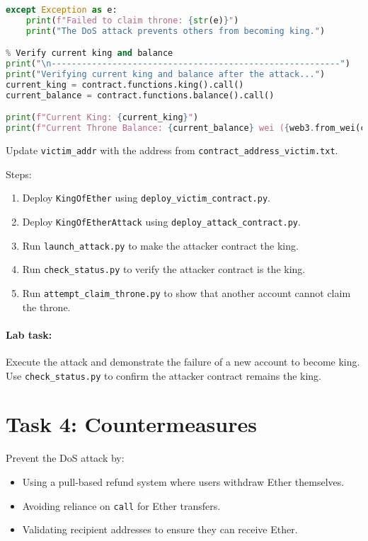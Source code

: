 \begin{lstlisting}[language=python, caption={Attempting to claim throne (\texttt{attempt\_claim\_throne.py})}]
except Exception as e:
    print(f"Failed to claim throne: {str(e)}")
    print("The DoS attack prevents others from becoming king.")

% Verify current king and balance
print("\n---------------------------------------------------------")
print("Verifying current king and balance after the attack...")
current_king = contract.functions.king().call()
current_balance = contract.functions.balance().call()

print(f"Current King: {current_king}")
print(f"Current Throne Balance: {current_balance} wei ({web3.from_wei(current_balance, 'ether')} ETH)")
\end{lstlisting}

Update \texttt{victim\_addr} with the address from \texttt{contract\_address\_victim.txt}.

Steps:
\begin{enumerate}
    \item Deploy \texttt{KingOfEther} using \texttt{deploy\_victim\_contract.py}.
    \item Deploy \texttt{KingOfEtherAttack} using \texttt{deploy\_attack\_contract.py}.
    \item Run \texttt{launch\_attack.py} to make the attacker contract the king.
    \item Run \texttt{check\_status.py} to verify the attacker contract is the king.
    \item Run \texttt{attempt\_claim\_throne.py} to show that another account cannot claim the throne.
\end{enumerate}

\paragraph{Lab task:} Execute the attack and demonstrate the failure of a new account to become king. Use \texttt{check\_status.py} to confirm the attacker contract remains the king.

\section{Task 4: Countermeasures}

Prevent the DoS attack by:
\begin{itemize}
    \item Using a pull-based refund system where users withdraw Ether themselves.
    \item Avoiding reliance on \texttt{call} for Ether transfers.
    \item Validating recipient addresses to ensure they can receive Ether.
\end{itemize}

